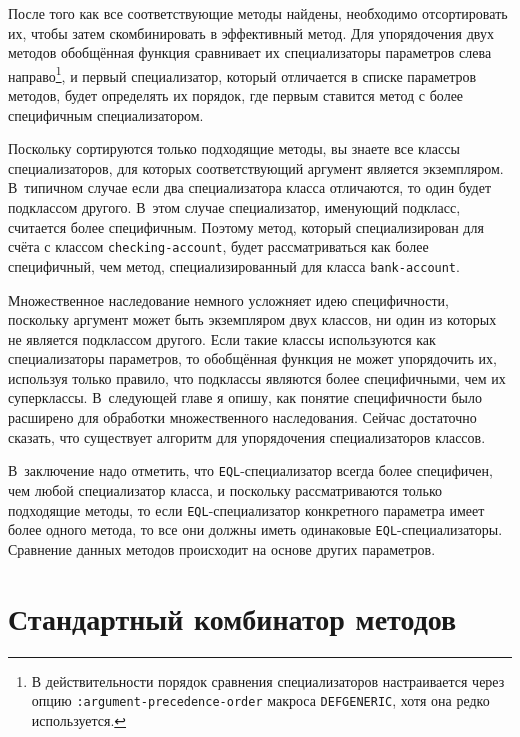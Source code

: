 После того как все соответствующие методы найдены, необходимо отсортировать их, чтобы
затем скомбинировать в эффективный метод.  Для упорядочения двух методов обобщённая
функция сравнивает их специализаторы параметров слева направо\footnote{В
  действительности порядок сравнения специализаторов настраивается через опцию
  \lstinline{:argument-precedence-order} макроса \lstinline{DEFGENERIC}, хотя она редко
  используется.}\hspace{\footnotenegspace}, и первый специализатор, который отличается в списке параметров методов,
будет определять их порядок, где первым ставится метод с более специфичным
специализатором.

Поскольку сортируются только подходящие методы, вы знаете все классы специализаторов, для
которых соответствующий аргумент является экземпляром.  В~типичном случае если два
специализатора класса отличаются, то один будет подклассом другого.  В~этом случае
специализатор, именующий подкласс, считается более специфичным.  Поэтому метод, который
специализирован для счёта с классом \lstinline{checking-account}, будет рассматриваться как
более специфичный, чем метод, специализированный для класса \lstinline{bank-account}.

Множественное наследование немного усложняет идею специфичности, поскольку аргумент может
быть экземпляром двух классов, ни один из которых не является подклассом другого.  Если
такие классы используются как специализаторы параметров, то обобщённая функция не может
упорядочить их, используя только правило, что подклассы являются более специфичными, чем их
суперклассы.  В~следующей главе я опишу, как понятие специфичности было расширено для
обработки множественного наследования.  Сейчас достаточно сказать, что существует алгоритм
для упорядочения специализаторов классов.

В~заключение надо отметить, что \lstinline{EQL}-специализатор всегда более специфичен, чем
любой специализатор класса, и поскольку рассматриваются только подходящие методы, то если
\lstinline{EQL}-специализатор конкретного параметра имеет более одного метода, то все они
должны иметь одинаковые \lstinline{EQL}-специализаторы.  Сравнение данных методов происходит на
основе других параметров.

\vfill{}

\section{Стандартный комбинатор методов}

